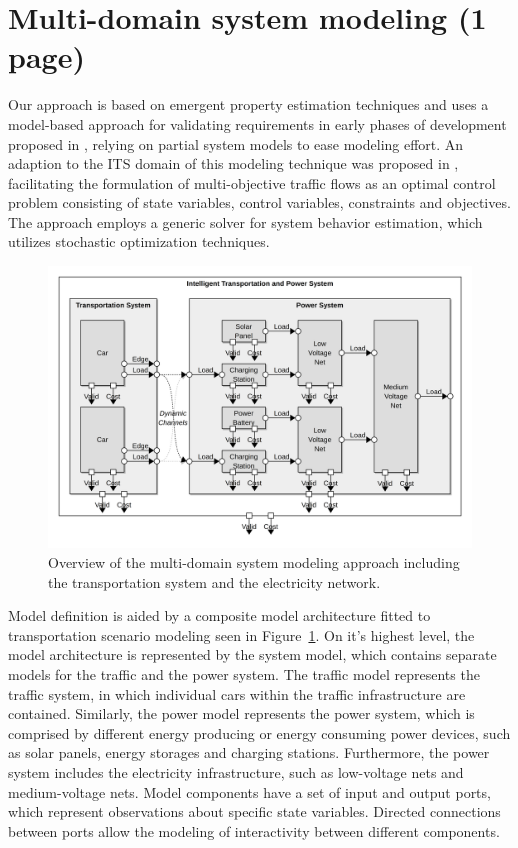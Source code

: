 \section{Multi-domain system modeling (1 page)}
\label{section:contribution_1}

Our approach is based on emergent property estimation techniques \cite{hackenberg2012towards} and uses a model-based approach for validating requirements in early phases of development proposed in \cite{hackenberg2014rapid}, relying on partial system models to ease modeling effort. An adaption to the ITS domain of this modeling technique was proposed in \cite{ascher2014early}, facilitating the formulation of multi-objective traffic flows as an optimal control problem consisting of state variables, control variables, constraints and objectives. The approach employs a generic solver for system behavior estimation, which utilizes stochastic optimization techniques.

\begin{figure}[h]
	\centering
	\includegraphics[width=\columnwidth]{../gfx/model.png}
	\caption{Overview of the multi-domain system modeling approach including the transportation system and the electricity network.}
	\label{fig:model}
\end{figure}

Model definition is aided by a composite model architecture fitted to transportation scenario modeling seen in Figure~\ref{fig:model}. On it's highest level, the model architecture is represented by the system model, which contains separate models for the traffic and the power system. The traffic model represents the traffic system, in which individual cars within the traffic infrastructure are contained. Similarly, the power model represents the power system, which is comprised by different energy producing or energy consuming power devices, such as solar panels, energy storages and charging stations. Furthermore, the power system includes the electricity infrastructure, such as low-voltage nets and medium-voltage nets. Model components have a set of input and output ports, which represent observations about specific state variables. Directed connections between ports allow the modeling of interactivity between different components.

